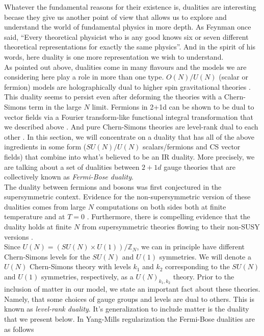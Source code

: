         Whatever the fundamental reasons for their existence is, dualities are interesting becase they give us another point of view that allows us to explore and understand the world of fundamental physics in more depth. As Feynman once said, ``Every theoretical physicist who is any good knows six or seven different theoretical representations for exactly the same physics''\cite{Feynman_quote}. And in the spirit of his words, here duality is one more representation we wish to understand.\\
        \indent As pointed out above, dualities come in many flavours and the models we are considering here play a role in more than one type. $O(N)/U(N)$ (scalar or fermion) models are holographically dual to higher spin gravitational theories \cite{Klebanov:2002ja}. This duality seems to persist even after deforming the theories with a Chern-Simons term in the large $N$ limit\cite{Aharony:2011jz}. Fermions in 2+1d can be shown to be dual to vector fields via a Fourier transform-like functional integral transformation that we described above \cite{Burgess:1993np, Barci:1995iy}. And pure Chern-Simons theories are level-rank dual to each other \cite{Naculich:1990pa, Camperi:1990dk, Mlawer:1990uv, Nakanishi:1990hj, Naculich:2007nc}. In this section, we will concentrate on a duality that has all of the above ingredients in some form ($SU(N)/U(N)$ scalars/fermions and CS vector fields) that combine into what's believed to be an IR duality. More precisely, we are talking about a set of dualities between $2+1d$ gauge theories that are collectively known as \textit{Fermi-Bose duality}.\\
        \indent The duality between fermions and bosons was first conjectured  in the supersymmetric context\cite{Giveon:2008zn, Benini:2011mf, Aharony:2013dha, Aharony:2014uya}. Evidence for the non-supersymmetric version of these dualities comes from large $N$ computations on both sides both at finite temperature \cite{Aharony:2012ns}  and at $T=0$ \cite{Giombi:2011kc}. Furthermore, there is compelling evidence that the duality holds at finite $N$ from supersymmetric theories flowing to their non-SUSY versions \cite{Jain:2013gza, Gur-Ari:2015pca}.\\
        \indent Since $U(N) = (SU(N)\times U(1))/\mathbb{Z}_N$, we can in principle have different Chern-Simons levels for the $SU(N)$ and $U(1)$ symmetries. We will denote a $U(N)$ Chern-Simons theory with levels $k_1$ and $k_2$ corresponding to the $SU(N)$ and $U(1)$ symmetries, respectively, as a $U(N)_{k_1,k_2}$ theory. Prior to the inclusion of matter in our model, we state an important fact about these theories. Namely, that some choices of gauge groups and levels are dual to others. This is known as \textit{level-rank duality}. It's generalization to include matter is the duality that we present below. In Yang-Mills regularization the Fermi-Bose dualities are as follows \cite{Aharony:2015mjs} \colorbox{red}{ }
